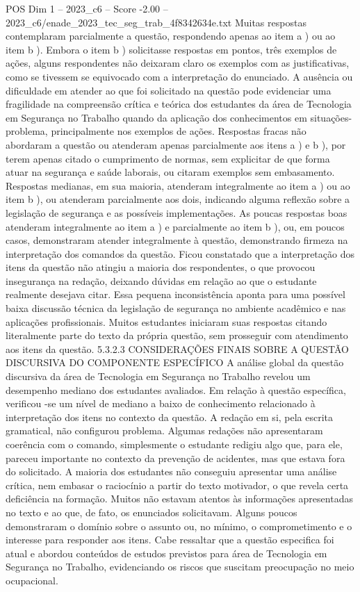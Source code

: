 \begin{textsample}{POS Dim 1 – 2023\_c6 – Score -2.00 – 2023\_c6/enade\_2023\_tec\_seg\_trab\_4f8342634e.txt}
Muitas respostas contemplaram parcialmente a questão, respondendo apenas ao item a ) ou ao item b ).
Embora o item b ) solicitasse respostas em pontos, três exemplos de ações, alguns respondentes não deixaram claro os exemplos com as justificativas, como se tivessem se equivocado com a interpretação do enunciado.
A ausência ou dificuldade em atender ao que foi solicitado na questão pode evidenciar uma fragilidade na compreensão crítica e teórica dos estudantes da área de Tecnologia em Segurança no Trabalho quando da aplicação dos conhecimentos em situações-problema, principalmente nos exemplos de ações.
Respostas fracas não abordaram a questão ou atenderam apenas parcialmente aos itens a ) e b ), por terem apenas citado o cumprimento de normas, sem explicitar de que forma atuar na segurança e saúde laborais, ou citaram exemplos sem embasamento.
Respostas medianas, em sua maioria, atenderam integralmente ao item a ) ou ao item b ), ou atenderam parcialmente aos dois, indicando alguma reflexão sobre a legislação de segurança e as possíveis implementações.
As poucas respostas boas atenderam integralmente ao item a ) e parcialmente ao item b ), ou, em poucos casos, demonstraram atender integralmente à questão, demonstrando firmeza na interpretação dos comandos da questão.
Ficou constatado que a interpretação dos itens da questão não atingiu a maioria dos respondentes, o que provocou insegurança na redação, deixando dúvidas em relação ao que o estudante realmente desejava citar.
Essa pequena inconsistência aponta para uma possível baixa discussão técnica da legislação de segurança no ambiente acadêmico e nas aplicações profissionais.
Muitos estudantes iniciaram suas respostas citando literalmente parte do texto da própria questão, sem prosseguir com atendimento aos itens da questão. 5.3.2.3 CONSIDERAÇÕES FINAIS SOBRE A QUESTÃO DISCURSIVA DO COMPONENTE ESPECÍFICO A análise global da questão discursiva da área de Tecnologia em Segurança no Trabalho revelou um desempenho mediano dos estudantes avaliados.
Em relação à questão específica, verificou -se um nível de mediano a baixo de conhecimento relacionado à interpretação dos itens no contexto da questão.
A redação em si, pela escrita gramatical, não configurou problema.
Algumas redações não apresentaram coerência com o comando, simplesmente o estudante redigiu algo que, para ele, pareceu importante no contexto da prevenção de acidentes, mas que estava fora do solicitado.
A maioria dos estudantes não conseguiu apresentar uma análise crítica, nem embasar o raciocínio a partir do texto motivador, o que revela certa deficiência na formação.
Muitos não estavam atentos às informações apresentadas no texto e ao que, de fato, os enunciados solicitavam.
Alguns poucos demonstraram o domínio sobre o assunto ou, no mínimo, o comprometimento e o interesse para responder aos itens.
Cabe ressaltar que a questão especifica foi atual e abordou conteúdos de estudos previstos para área de Tecnologia em Segurança no Trabalho, evidenciando os riscos que suscitam preocupação no meio ocupacional.

\end{textsample}
